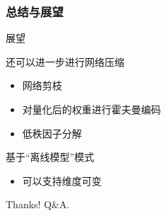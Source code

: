 \documentclass[12pt]{ctexbeamer}
\begin{document}
\begin{frame}
  \frametitle{总结与展望}
    \begin{block}{展望}
      \begin{block}{还可以进一步进行网络压缩}
	   \begin{itemize}
          \item 网络剪枝
          \item 对量化后的权重进行霍夫曼编码
          \item 低秩因子分解
     	   \end{itemize}
     \end{block}
     \begin{block}{基于“离线模型”模式}
	   \begin{itemize}
          \item 可以支持维度可变
     	   \end{itemize}
     \end{block}
   \end{block}
\end{frame}  

\begin{frame}
  \centerline{\Large Thanks! Q\&A.}
\end{frame}
\end{document}
